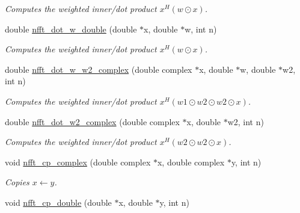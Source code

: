 \begin{CompactItemize}
\begin{CompactList}\small\item\em Computes the weighted inner/dot product $x^H (w \odot x)$. \item\end{CompactList}\item 
\hypertarget{group__nfftutil_ga18}{
double \hyperlink{group__nfftutil_ga18}{nfft\_\-dot\_\-w\_\-double} (double $\ast$x, double $\ast$w, int n)}
\label{group__nfftutil_ga18}

\begin{CompactList}\small\item\em Computes the weighted inner/dot product $x^H (w \odot x)$. \item\end{CompactList}\item 
\hypertarget{group__nfftutil_ga19}{
double \hyperlink{group__nfftutil_ga19}{nfft\_\-dot\_\-w\_\-w2\_\-complex} (double complex $\ast$x, double $\ast$w, double $\ast$w2, int n)}
\label{group__nfftutil_ga19}

\begin{CompactList}\small\item\em Computes the weighted inner/dot product $x^H (w1\odot w2\odot w2 \odot x)$. \item\end{CompactList}\item 
\hypertarget{group__nfftutil_ga20}{
double \hyperlink{group__nfftutil_ga20}{nfft\_\-dot\_\-w2\_\-complex} (double complex $\ast$x, double $\ast$w2, int n)}
\label{group__nfftutil_ga20}

\begin{CompactList}\small\item\em Computes the weighted inner/dot product $x^H (w2\odot w2 \odot x)$. \item\end{CompactList}\item 
\hypertarget{group__nfftutil_ga21}{
void \hyperlink{group__nfftutil_ga21}{nfft\_\-cp\_\-complex} (double complex $\ast$x, double complex $\ast$y, int n)}
\label{group__nfftutil_ga21}

\begin{CompactList}\small\item\em Copies $x \leftarrow y$. \item\end{CompactList}\item 
\hypertarget{group__nfftutil_ga22}{
void \hyperlink{group__nfftutil_ga22}{nfft\_\-cp\_\-double} (double $\ast$x, double $\ast$y, int n)}
\label{group__nfftutil_ga22}


\end{CompactItemize}
